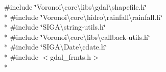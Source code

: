 {\ttfamily \#include \char`\"{}Voronoi\textbackslash{}core\textbackslash{}libs\textbackslash{}gdal\textbackslash{}shapefile.\+h\char`\"{}}\\*
{\ttfamily \#include \char`\"{}Voronoi\textbackslash{}core\textbackslash{}hidro\textbackslash{}rainfall\textbackslash{}rainfall.\+h\char`\"{}}\\*
{\ttfamily \#include \char`\"{}S\+I\+G\+A\textbackslash{}string-\/utils.\+h\char`\"{}}\\*
{\ttfamily \#include \char`\"{}Voronoi\textbackslash{}core\textbackslash{}libs\textbackslash{}callback-\/utils.\+h\char`\"{}}\\*
{\ttfamily \#include \char`\"{}S\+I\+G\+A\textbackslash{}\+Date\textbackslash{}cdate.\+h\char`\"{}}\\*
{\ttfamily \#include $<$gdal\+\_\+frmts.\+h$>$}\\*
